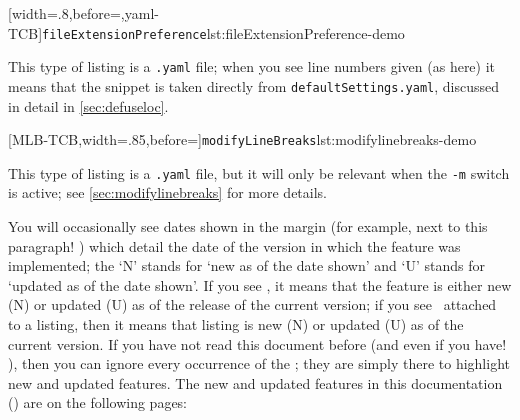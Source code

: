 	\begin{minipage}{.4\textwidth}
		[width=.8\linewidth,before=\centering,yaml-TCB]{\texttt{fileExtensionPreference}}{lst:fileExtensionPreference-demo}
	\end{minipage}%
	\hfill
	\begin{minipage}{.4\textwidth}
		This type of listing is a \texttt{.yaml} file; when you see line numbers given (as here) it means that the snippet is taken directly from \texttt{defaultSettings.yaml}, discussed in detail in \vref{sec:defuseloc}.
	\end{minipage}%

	\begin{minipage}{.55\textwidth}
		[MLB-TCB,width=.85\linewidth,before=\centering]{\texttt{modifyLineBreaks}}{lst:modifylinebreaks-demo}
	\end{minipage}%
	\hfill
	\begin{minipage}{.4\textwidth}
		This type of listing is a \texttt{.yaml} file, but it will only be relevant when the \texttt{-m} switch is active; see \vref{sec:modifylinebreaks} for more details.
	\end{minipage}%

	You will occasionally see dates shown in the margin (for example, next to this paragraph!
	)
	 which detail the date of the version in which the feature was implemented;
	the `N' stands for `new as of the date shown' and `U' stands for `updated as of the date shown'.
	If you see \stardemo, it means that the feature is either new (N) or updated (U) as of the release of the current version; if you see \stardemo\, attached to a listing, then it means that listing is new (N) or updated (U) as of the current version.
	If you have not read this document before (and even if you have!
	), then you can ignore every occurrence of the \stardemo;
	they are simply there to highlight new and updated features.
	The new and updated features in this documentation (\gitRel) are on the following pages: \listOfNewFeatures
